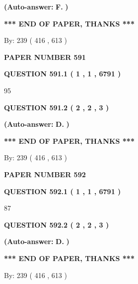 \documentclass[12pt]{article}
\begin{document}
 
{\textbf{(Auto-answer:}}
{\textbf{\large{
F.}}}
{\textbf{)}}
 
 
   
   
   
   
\vspace{1.0in} 
{\textbf{\large{ *** END OF PAPER, THANKS *** }}} 
   
   
\hspace{1.0in} By: 
 239 ( 416 ,  613 )
   
   
   
   
\newpage 
\setcounter{page}{ 
   591001 } 
   
   
 {\textbf{ \Large{ PAPER NUMBER  591  }}}
   
   
   
   
  
  
{\textbf{\large{QUESTION
591.1 
 ( 1 , 1 , 6791 )
}}}

95
  
  
{\textbf{\large{QUESTION
591.2 
 ( 2 , 2 , 3 )
}}}
 
 
{\textbf{(Auto-answer:}}
{\textbf{\large{
D.}}}
{\textbf{)}}
 
 
   
   
   
   
\vspace{1.0in} 
{\textbf{\large{ *** END OF PAPER, THANKS *** }}} 
   
   
\hspace{1.0in} By: 
 239 ( 416 ,  613 )
   
   
   
   
\newpage 
\setcounter{page}{ 
   592001 } 
   
   
 {\textbf{ \Large{ PAPER NUMBER  592  }}}
   
   
   
   
  
  
{\textbf{\large{QUESTION
592.1 
 ( 1 , 1 , 6791 )
}}}

87
  
  
{\textbf{\large{QUESTION
592.2 
 ( 2 , 2 , 3 )
}}}
 
 
{\textbf{(Auto-answer:}}
{\textbf{\large{
D.}}}
{\textbf{)}}
 
 
   
   
   
   
\vspace{1.0in} 
{\textbf{\large{ *** END OF PAPER, THANKS *** }}} 
   
   
\hspace{1.0in} By: 
 239 ( 416 ,  613 )
   
   
   
\end{document}
